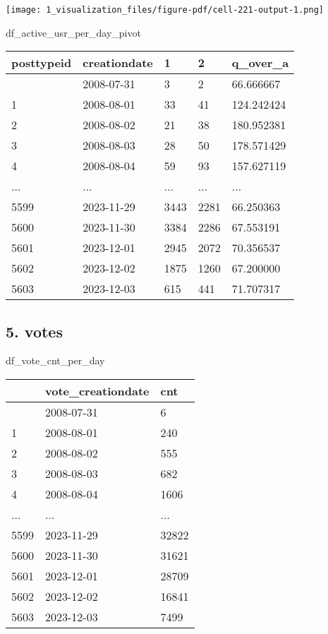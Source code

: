 \documentclass[
  letterpaper,
  DIV=11,
  numbers=noendperiod]{scrartcl}
\newenvironment{Shaded}{\begin{snugshade}}{\end{snugshade}}
\newcommand{\NormalTok}[1]{\textcolor[rgb]{0.00,0.23,0.31}{#1}}
\begin{document}
\texttt{[image: 1\_visualization\_files/figure-pdf/cell-221-output-1.png]}

\begin{Shaded}
\begin{Highlighting}[]
\NormalTok{df\_active\_usr\_per\_day\_pivot}
\end{Highlighting}
\end{Shaded}

\begin{longtable}[]{@{}lllll@{}}
\toprule\noalign{}
posttypeid & creationdate & 1 & 2 & q\_over\_a \\
\midrule\noalign{}
\endhead
\bottomrule\noalign{}
\endlastfoot
0 & 2008-07-31 & 3 & 2 & 66.666667 \\
1 & 2008-08-01 & 33 & 41 & 124.242424 \\
2 & 2008-08-02 & 21 & 38 & 180.952381 \\
3 & 2008-08-03 & 28 & 50 & 178.571429 \\
4 & 2008-08-04 & 59 & 93 & 157.627119 \\
... & ... & ... & ... & ... \\
5599 & 2023-11-29 & 3443 & 2281 & 66.250363 \\
5600 & 2023-11-30 & 3384 & 2286 & 67.553191 \\
5601 & 2023-12-01 & 2945 & 2072 & 70.356537 \\
5602 & 2023-12-02 & 1875 & 1260 & 67.200000 \\
5603 & 2023-12-03 & 615 & 441 & 71.707317 \\
\end{longtable}

\subsection{5. votes}\label{votes}

\begin{Shaded}
\begin{Highlighting}[]
\NormalTok{df\_vote\_cnt\_per\_day}
\end{Highlighting}
\end{Shaded}

\begin{longtable}[]{@{}lll@{}}
\toprule\noalign{}
& vote\_creationdate & cnt \\
\midrule\noalign{}
\endhead
\bottomrule\noalign{}
\endlastfoot
0 & 2008-07-31 & 6 \\
1 & 2008-08-01 & 240 \\
2 & 2008-08-02 & 555 \\
3 & 2008-08-03 & 682 \\
4 & 2008-08-04 & 1606 \\
... & ... & ... \\
5599 & 2023-11-29 & 32822 \\
5600 & 2023-11-30 & 31621 \\
5601 & 2023-12-01 & 28709 \\
5602 & 2023-12-02 & 16841 \\
5603 & 2023-12-03 & 7499 \\
\end{longtable}
\end{document}
